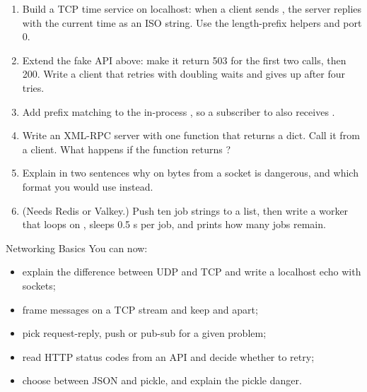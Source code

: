 \begin{practice}
\begin{enumerate}[leftmargin=*,itemsep=2pt]
\item Build a TCP time service on localhost: when a client sends , the server
  replies with the current time as an ISO string. Use the length-prefix helpers and port 0.
\item Extend the fake API above: make it return 503 for the first two calls, then 200.
  Write a client that retries with doubling waits and gives up after four tries.
\item Add prefix matching to the in-process , so a subscriber to
   also receives .
\item Write an XML-RPC server with one function that returns a dict. Call it from a client.
  What happens if the function returns ?
\item Explain in two sentences why  on bytes from a socket is dangerous,
  and which format you would use instead.
\item (Needs Redis or Valkey.) Push ten job strings to a list, then write a worker that
  loops on , sleeps 0.5 s per job, and prints how many jobs remain.
\end{enumerate}
\end{practice}

\begin{achievement}{Networking Basics}
You can now:
\begin{itemize}[leftmargin=*,itemsep=1pt]
\item explain the difference between UDP and TCP and write a localhost echo with sockets;
\item frame messages on a TCP stream and keep  and  apart;
\item pick request-reply, push or pub-sub for a given problem;
\item read HTTP status codes from an API and decide whether to retry;
\item choose between JSON and pickle, and explain the pickle danger.
\end{itemize}
\end{achievement}
